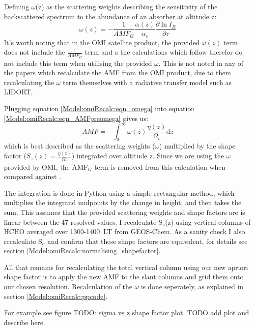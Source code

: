     Defining $\omega$(z) as the scattering weights describing the sensitivity of the backscattered spectrum to the abundance of an absorber at altitude z:
    \begin{equation} \label{Model:omiRecalc:eqn_omega}
    \omega(z) = -\frac{1}{AMF_G} \frac{\alpha(z)}{\alpha_e} \frac{\partial \ln{I_B}}{\partial \tau}
    \end{equation}
    It's worth noting that in the OMI satellite product, the provided $\omega(z)$ term does not include the $\frac{1}{AMF_G}$ term and a the calculations which follow therefor do not include this term when utilising the provided $\omega$.
    This is not noted in any of the papers which recalculate the AMF from the OMI product, due to them recalculating the $\omega$ term themselves with a radiative transfer model such as LIDORT.
    
    Plugging equation \ref{Model:omiRecalc:eqn_omega} into equation \ref{Model:omiRecalc:eqn_AMFpreomega} gives us:
    \begin{equation}
      AMF = -\int_0^\infty{ \omega(z) \frac{\eta(z)}{\Omega_v} \mathrm{d}z}
    \end{equation}
    which is best described as the scattering weights ($\omega$) multiplied by the shape factor ($S_z(z) = \frac{\eta(z)}{\Omega_v}$) integrated over altitude z.
    Since we are using the $\omega$ provided by OMI, the AMF$_G$ term is removed from this calculation when compared against \textcite{Palmer2001}.
    
    The integration is done in Python using a simple rectangular method, which multiplies the integrand midpoints by the change in height, and then takes the sum.
    This assumes that the provided scattering weights and shape factors are is linear between the 47 resolved values.
    I recalculate S$_z$(z) using vertical columns of HCHO averaged over 1300-1400~LT from GEOS-Chem.
    As a sanity check I also recalculate S$_\sigma$ and confirm that these shape factors are equivalent, for details see section \ref{Model:omiRecalc:normalising_shapefactor}.
    
    All that remains for recalculating the total vertical column using our new apriori shape factor is to apply the new AMF to the slant columns and grid them onto our chosen resolution.
    Recalculation of the $\omega$ is done seperately, as explained in section \ref{Model:omiRecalc:ppcode}.
    
    
    For example see figure TODO: sigma vs z shape factor plot.
    TODO add plot and describe here.
    
